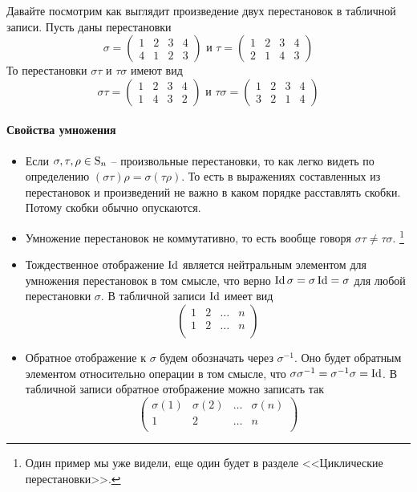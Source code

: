 Давайте посмотрим как выглядит произведение двух перестановок в табличной записи.
Пусть даны перестановки
\[
\sigma = 
\begin{pmatrix}
{1}&{2}&{3}&{4}\\
{4}&{1}&{2}&{3}
\end{pmatrix}\text{ и }
\tau = 
\begin{pmatrix}
{1}&{2}&{3}&{4}\\
{2}&{1}&{4}&{3}
\end{pmatrix}
\]
То перестановки $\sigma \tau$ и $\tau\sigma$ имеют вид
\[
\sigma \tau= 
\begin{pmatrix}
{1}&{2}&{3}&{4}\\
{1}&{4}&{3}&{2}
\end{pmatrix}\text{ и }
\tau \sigma= 
\begin{pmatrix}
{1}&{2}&{3}&{4}\\
{3}&{2}&{1}&{4}
\end{pmatrix}
\]


\paragraph{Свойства умножения}

\begin{itemize}
\item Если $\sigma, \tau, \rho \in\operatorname{S}_{n}$ -- произвольные перестановки, то как легко видеть по определению $(\sigma\tau)\rho = \sigma(\tau\rho)$.
То есть в выражениях составленных из перестановок и произведений не важно в каком порядке расставлять скобки.
Потому скобки обычно опускаются.

\item Умножение перестановок не коммутативно, то есть вообще говоря $\sigma\tau \neq \tau \sigma$.%
\footnote{Один пример мы уже видели, еще один будет в разделе <<Циклические перестановки>>.} 

\item Тождественное отображение $\operatorname{Id}$ является нейтральным элементом для умножения перестановок в том смысле, что верно $\operatorname{Id} \sigma = \sigma \operatorname{Id} = \sigma$ для любой перестановки $\sigma$.
В табличной записи $\operatorname{Id}$ имеет вид
\[
\begin{pmatrix}
{1}&{2}&{\ldots}&{n}\\
{1}&{2}&{\ldots}&{n}\\
\end{pmatrix}
\]

\item Обратное отображение к $\sigma$ будем обозначать через $\sigma^{-1}$.
Оно будет обратным элементом относительно операции в том смысле, что $\sigma \sigma^{-1} = \sigma^{-1}\sigma = \operatorname{Id}$.
В табличной записи обратное отображение можно записать так
\[
\begin{pmatrix}
{\sigma(1)}&{\sigma(2)}&{\ldots}&{\sigma(n)}\\
{1}&{2}&{\ldots}&{n}\\
\end{pmatrix}
\]
\end{itemize}

